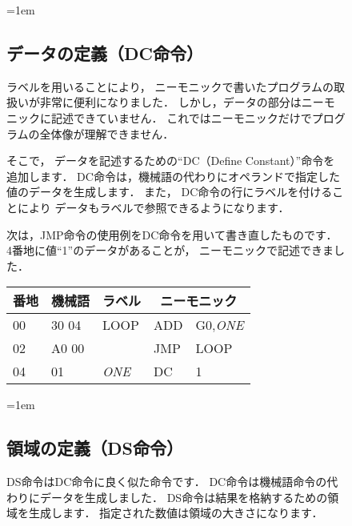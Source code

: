 \begin{figure}[btp]
  \begin{framed}{\parindent=1em
      \subsection*{データの定義（DC命令）}
      ラベルを用いることにより，
      ニーモニックで書いたプログラムの取扱いが非常に便利になりました．
      しかし，データの部分はニーモニックに記述できていません．
      これではニーモニックだけでプログラムの全体像が理解できません．

      そこで，
      データを記述するための``DC（Define Constant）''命令を追加します．
      DC命令は，機械語の代わりにオペランドで指定した値のデータを生成します．
      また，
      DC命令の行にラベルを付けることにより
      データもラベルで参照できるようになります．

      次は，JMP命令の使用例をDC命令を用いて書き直したものです．
      4番地に値``1''のデータがあることが，
      ニーモニックで記述できました．

      {\small\ttfamily\begin{center}
        \begin{tabular}{|l|l|l|l l|} \hline
          番地 & 機械語 & ラベル & \multicolumn{2}{|c|}{ニーモニック} \\
          \hline
          00 & 30 04 & LOOP       & ADD  & G0,\emph{ONE}  \\
          02 & A0 00 &            & JMP  & LOOP          \\
          04 & 01    & \emph{ONE}  & DC   & 1             \\
          \hline
        \end{tabular}
      \end{center}}
  }\end{framed}
\end{figure}

\begin{figure}[btp]
  \begin{framed}{\parindent=1em
      \subsection*{領域の定義（DS命令）}
      DS命令はDC命令に良く似た命令です．
      DC命令は機械語命令の代わりにデータを生成しました．
      DS命令は結果を格納するための領域を生成します．
      指定された数値は領域の大きさになります．
  }\end{framed}
\end{figure}

